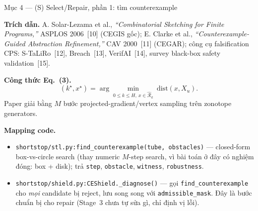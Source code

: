 \documentclass[aspectratio=169]{beamer}
\begin{document}
\begin{frame}[t,shrink=8]{Mục 4 --- (S) Select/Repair, phần 1: tìm counterexample}

\textbf{Trích dẫn.} A. Solar-Lezama et al., \emph{``Combinatorial Sketching for Finite Programs,''} ASPLOS 2006~[10] (CEGIS gốc); E. Clarke et al., \emph{``Counterexample-Guided Abstraction Refinement,''} CAV 2000~[11] (CEGAR); công cụ falsification CPS: S-TaLiRo~[12], Breach~[13], VerifAI~[14], survey black-box safety validation~[15].

\vspace{5pt}
\textbf{Công thức Eq.~(3).}
\[
(k^\star,x^\star)=\arg\min_{0\le k\le H,\ x\in\hat{\mathcal R}_k}\ \mathrm{dist}(x,X_u).
\]
Paper giải bằng $M$ bước projected-gradient/vertex sampling trên zonotope generators.

\vspace{5pt}
\textbf{Mapping code.}
\begin{itemize}
    \item \texttt{shortstop/stl.py:find\_counterexample(tube, obstacles)} --- closed-form box-vs-circle search (thay numeric $M$-step search, vì bài toán ở đây có nghiệm đóng: box + disk); trả \texttt{step}, \texttt{obstacle}, \texttt{witness}, \texttt{robustness}.
    \item \texttt{shortstop/shield.py:CEShield.\_diagnose()} --- gọi \texttt{find\_counterexample} cho \emph{mọi} candidate bị reject, lưu song song với \texttt{admissible\_mask}. Đây là bước chuẩn bị cho repair (Stage~3 chưa tự sửa gì, chỉ định vị lỗi).
\end{itemize}
\end{frame}
\end{document}
